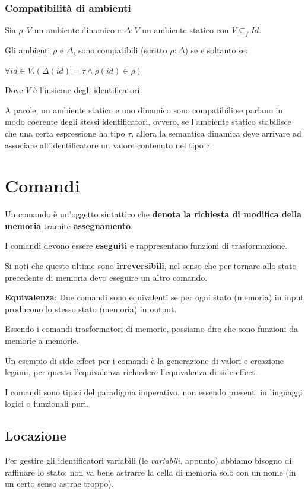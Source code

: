 \documentclass[12pt,a4paper]{article}
\begin{document}
\subsubsection{Compatibilità di ambienti}

Sia $\rho:V$ un ambiente dinamico e $\Delta:V$ un ambiente statico con $V\subseteq_f Id$.

Gli ambienti $\rho$ e $\Delta$, sono compatibili (scritto $\rho:\Delta$) se e soltanto se:

\begin{center}
$\forall id \in V . (\Delta(id) = \tau \wedge \rho(id) \in \rho)$
\end{center}

Dove $V$ è l'insieme degli identificatori.

A parole, un ambiente statico e uno dinamico sono compatibili se parlano in modo coerente degli stessi identificatori, ovvero, se l’ambiente statico stabilisce che una certa espressione ha tipo $\tau$, allora la semantica dinamica deve arrivare ad associare all’identificatore un valore contenuto nel tipo $\tau$.
\section{Comandi} \label{Comandi}
Un comando è un'oggetto sintattico che \textbf{denota la richiesta di modifica della memoria} tramite \textbf{assegnamento}.

I comandi devono essere \textbf{eseguiti} e rappresentano funzioni di trasformazione.

Si noti che queste ultime sono \textbf{irreversibili}, nel senso che per tornare allo stato precedente di memoria devo eseguire un altro comando.

\textbf{Equivalenza}: Due comandi sono equivalenti se per ogni stato (memoria) in input producono lo stesso stato (memoria) in output.

Essendo i comandi trasformatori di memorie, possiamo dire che sono funzioni da memorie a memorie.

Un esempio di side-effect per i comandi è la generazione di valori e creazione legami, per questo l'equivalenza richiedere l'equivalenza di side-effect.

I comandi sono tipici del paradigma imperativo, non essendo presenti in linguaggi logici o funzionali puri.
\subsection{Locazione}\label{locazione}
Per gestire gli identificatori variabili (le \textit{variabili}, appunto) abbiamo bisogno di raffinare lo stato: non va bene astrarre la cella di memoria solo con un nome (in un certo senso astrae troppo).
\end{document}
